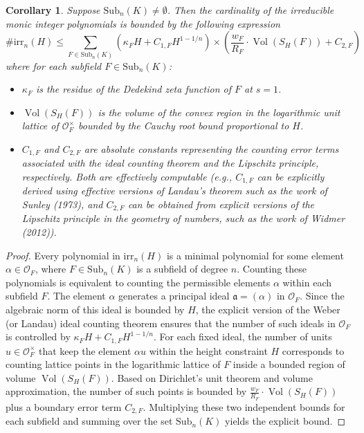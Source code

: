 \documentclass[11pt,a4paper]{article}
\newtheorem{corollary}[theorem]{Corollary}
\newcommand{\OF}{\mathcal{O}_F}
\newcommand{\Vol}{\operatorname{Vol}}
\begin{document}
\begin{corollary}
Suppose $\mathrm{Sub}_n(K) \neq \emptyset$. Then the cardinality of the irreducible monic integer polynomials is bounded by the following expression
\begin{equation*}
    \#\mathrm{irr}_n(H) \le \sum_{F \in \mathrm{Sub}_n(K)} \left( \kappa_F H + C_{1,F} H^{1 - 1/n} \right) \times \left( \frac{w_F}{R_F} \cdot \Vol(S_H(F)) + C_{2,F} \right)
\end{equation*}
where for each subfield $F \in \mathrm{Sub}_n(K)$:
\begin{itemize}
    \item $\kappa_F$ is the residue of the Dedekind zeta function of $F$ at $s = 1$.
    \item $\Vol(S_H(F))$ is the volume of the convex region in the logarithmic unit lattice of $\OF^\times$ bounded by the Cauchy root bound proportional to $H$.
    \item $C_{1,F}$ and $C_{2,F}$ are absolute constants representing the counting error terms associated with the ideal counting theorem and the Lipschitz principle, respectively. Both are effectively computable (e.g., $C_{1,F}$ can be explicitly derived using effective versions of Landau's theorem such as the work of Sunley (1973), and $C_{2,F}$ can be obtained from explicit versions of the Lipschitz principle in the geometry of numbers, such as the work of Widmer (2012)).
\end{itemize}
\end{corollary}

\begin{proof}
Every polynomial in $\mathrm{irr}_n(H)$ is a minimal polynomial for some element $\alpha \in \OF$, where $F \in \mathrm{Sub}_n(K)$ is a subfield of degree $n$. Counting these polynomials is equivalent to counting the permissible elements $\alpha$ within each subfield $F$. The element $\alpha$ generates a principal ideal $\mathfrak{a} = (\alpha)$ in $\OF$. Since the algebraic norm of this ideal is bounded by $H$, the explicit version of the Weber (or Landau) ideal counting theorem ensures that the number of such ideals in $\OF$ is controlled by $\kappa_F H + C_{1,F} H^{1 - 1/n}$. For each fixed ideal, the number of units $u \in \OF^\times$ that keep the element $\alpha u$ within the height constraint $H$ corresponds to counting lattice points in the logarithmic lattice of $F$ inside a bounded region of volume $\Vol(S_H(F))$. Based on Dirichlet's unit theorem and volume approximation, the number of such points is bounded by $\frac{w_F}{R_F} \cdot \Vol(S_H(F))$ plus a boundary error term $C_{2,F}$. Multiplying these two independent bounds for each subfield and summing over the set $\mathrm{Sub}_n(K)$ yields the explicit bound.
\end{proof}
\end{document}

